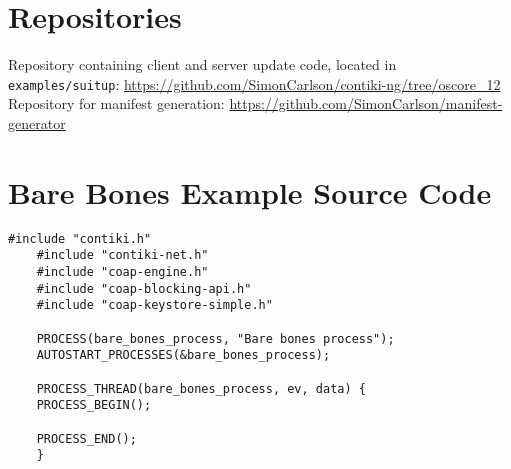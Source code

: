 \documentclass{kththesis}
\begin{document}
\chapter{Repositories}
\label{app:repos}
Repository containing client and server update code, located in \texttt{examples/suitup}:
\url{https://github.com/SimonCarlson/contiki-ng/tree/oscore_12}\\

\noindent Repository for manifest generation:
\url{https://github.com/SimonCarlson/manifest-generator}

\chapter{Bare Bones Example Source Code}
\label{app:bare-bones}
\begin{lstlisting}[language=manifest, caption={Bare bones Contiki-NG example.}, label=lst:bare-bones]
    #include "contiki.h"
    #include "contiki-net.h"
    #include "coap-engine.h"
    #include "coap-blocking-api.h"
    #include "coap-keystore-simple.h"

    PROCESS(bare_bones_process, "Bare bones process");
    AUTOSTART_PROCESSES(&bare_bones_process);

    PROCESS_THREAD(bare_bones_process, ev, data) {
    PROCESS_BEGIN();

    PROCESS_END();
    }
\end{lstlisting}

\end{document}
